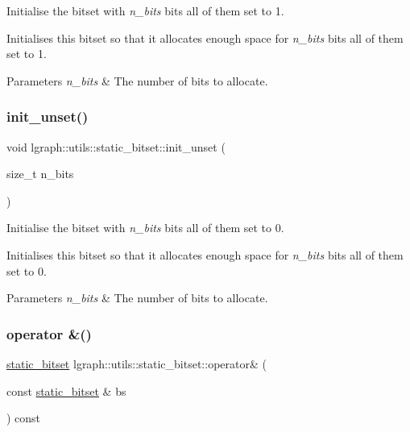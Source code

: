 Initialise the bitset with {\itshape n\+\_\+bits} bits all of them set to 1. 

Initialises this bitset so that it allocates enough space for {\itshape n\+\_\+bits} bits all of them set to 1.


\begin{DoxyParams}{Parameters}
{\em n\+\_\+bits} & The number of bits to allocate. \\
\hline
\end{DoxyParams}
\mbox{\label{classlgraph_1_1utils_1_1static__bitset_a6fb4d66f266593fe9c65451bf6212591}} 
\subsubsection{\texorpdfstring{init\+\_\+unset()}{init\_unset()}}
{\footnotesize\ttfamily void lgraph\+::utils\+::static\+\_\+bitset\+::init\+\_\+unset (\begin{DoxyParamCaption}\item[{size\+\_\+t}]{n\+\_\+bits }\end{DoxyParamCaption})}



Initialise the bitset with {\itshape n\+\_\+bits} bits all of them set to 0. 

Initialises this bitset so that it allocates enough space for {\itshape n\+\_\+bits} bits all of them set to 0.


\begin{DoxyParams}{Parameters}
{\em n\+\_\+bits} & The number of bits to allocate. \\
\hline
\end{DoxyParams}
\mbox{\label{classlgraph_1_1utils_1_1static__bitset_ade4bed9c986a5f328535c133bfa8eee7}} 
\subsubsection{\texorpdfstring{operator \&()}{operator \&()}}
{\footnotesize\ttfamily \hyperlink{classlgraph_1_1utils_1_1static__bitset}{static\+\_\+bitset} lgraph\+::utils\+::static\+\_\+bitset\+::operator\& (\begin{DoxyParamCaption}\item[{const \hyperlink{classlgraph_1_1utils_1_1static__bitset}{static\+\_\+bitset} \&}]{bs }\end{DoxyParamCaption}) const}



